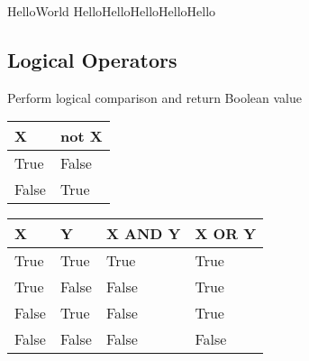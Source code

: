 \documentclass[letterpaper,10pt,english]{sphinxmanual}
\begin{document}
\begin{sphinxVerbatim}[commandchars=\\\{\}]
HelloWorld
HelloHelloHelloHelloHello
\end{sphinxVerbatim}


\subsection{Logical Operators}
\label{\detokenize{content/Introduction_to_Programming:logical-operators}}
Perform logical comparison and return Boolean value

\begin{sphinxVerbatim}[commandchars=\\\{\}]
   
   
   
   
   
   
\end{sphinxVerbatim}


\begin{savenotes}\sphinxattablestart
\centering
\begin{tabulary}{\linewidth}[t]{|T|T|}
\hline
\sphinxstyletheadfamily 
X
&\sphinxstyletheadfamily 
not X
\\
\hline
True
&
False
\\
\hline
False
&
True
\\
\hline
\end{tabulary}
\par
\sphinxattableend\end{savenotes}


\begin{savenotes}\sphinxattablestart
\centering
\begin{tabulary}{\linewidth}[t]{|T|T|T|T|}
\hline
\sphinxstyletheadfamily 
X
&\sphinxstyletheadfamily 
Y
&\sphinxstyletheadfamily 
X AND Y
&\sphinxstyletheadfamily 
X OR Y
\\
\hline
True
&
True
&
True
&
True
\\
\hline
True
&
False
&
False
&
True
\\
\hline
False
&
True
&
False
&
True
\\
\hline
False
&
False
&
False
&
False
\\
\hline
\end{tabulary}
\par
\sphinxattableend\end{savenotes}
\end{document}
